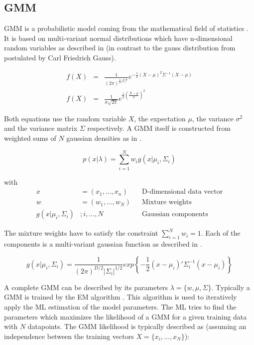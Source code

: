 \subsection{\acf*{GMM}}
\label{sec:gmm}

\acl{GMM} is a probabilistic model coming from the mathematical field of statistics \cite{mclachlan1988mixture}. It is based on multi-variant normal distributions which have n-dimensional random variables as described in  (in contrast to the gauss distribution from  postulated by Carl Friedrich Gauss).

\begin{eqnarray}
\label{eqn:mulgauss}
f(X) &=& \frac{
1
}{
(2\pi)^{\frac{n}{2} |\Sigma|^{\frac{1}{2}}}
} e ^ { - \frac{1}{2} (X - \mu)^T \Sigma^{-1} (X - \mu) }
\\
\label{eqn:singlegauss}
f(X) &=& \frac{1}{\sigma\sqrt{2\pi}}e^{\frac{1}{2} (\frac{X - \mu}{\sigma})^2}
\end{eqnarray}

Both equations use the random variable $X$, the expectation $\mu$, the variance $\sigma^2$ and the variance matrix $\Sigma$ respectively. A \acl{GMM} itself is constructed from weighted sums of $N$ gaussian densities as in .

\begin{equation}
p(x|\lambda) = \sum_{i=1}^{N} w_i g(x| \mu_i, \Sigma_i)
\label{eqn:gmm}
\end{equation}

with
\begin{align*}
x & = (x_{1},\dotsc,x_{n}) && \text{D-dimensional data vector}\\
w & = (w_1,\dots,w_{N}) && \text{Mixture weights}\\
g(x| \mu_i, \Sigma_i) & ; i,\dots,N && \text{Gaussian components}
\end{align*}

The mixture weights have to satisfy the constraint $\sum_{i=1}^N w_i = 1$. Each of the components is a multi-variant gaussian function as described in .

\begin{equation}
\label{eqn:gauss_func}
g(x|\mu_i, \Sigma_i) = \frac{1}{(2\pi)^{D/2} | \Sigma_i |^{1/2}} exp \left\{ - \frac{1}{2} (x - \mu_i)' \Sigma_i^{-1} (x - \mu_i) \right\}
\end{equation}

A complete \ac{GMM} can be described by its parameters $\lambda = \{w, \mu, \Sigma\}$. Typically a \ac{GMM} is trained by the \acf{EM} algorithm \cite{dempster1977maximum}. This algorithm is used to iteratively apply the \ac{ML} estimation of the model parameters. The \ac{ML} tries to find the parameters which maximizes the likelihood of a \ac{GMM} for a given training data with $N$ datapoints. The \ac{GMM} likelihood is typically described as (assuming an independence between the training vectors $X = \{x_i,\dots,x_N\}$):

